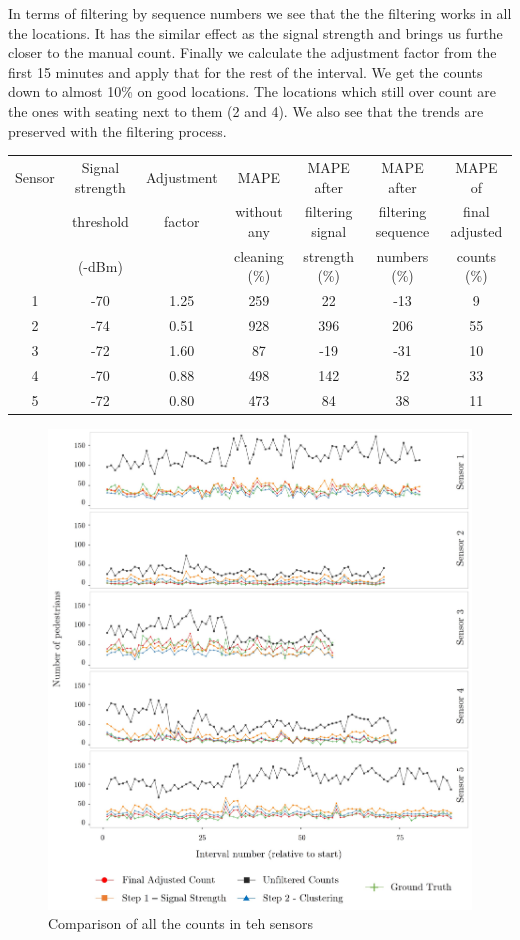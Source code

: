 In terms of filtering by sequence numbers we see that the the filtering works in all the locations. It has the similar effect as the signal strength and brings us furthe closer to the manual count. Finally we calculate the adjustment factor from the first 15 minutes and apply that for the rest of the interval. We get the counts down to almost 10\% on good locations. The locations which still over count are the ones with seating next to them (2 and 4). We also see that the trends are preserved with the filtering process.

\begin{table}
	{\begin{tabular}{ccccccc} 
		\toprule
			Sensor & Signal strength & Adjustment & MAPE & MAPE after & MAPE after & MAPE of\\
			& threshold & factor & without any & filtering signal & filtering sequence & final adjusted\\
			& (-dBm) & &  cleaning (\%) & strength (\%) & numbers (\%) & counts (\%)\\
		 \midrule
			1 & -70 & 1.25 & 259 &  22 & -13 &  9 \\
			2 & -74 & 0.51 & 928 & 396 & 206 & 55 \\
			3 & -72 & 1.60 &  87 & -19 & -31 & 10 \\
			4 & -70 & 0.88 & 498 & 142 &  52 & 33 \\
			5 & -72 & 0.80 & 473 &  84 &  38 & 11 \\
		 \bottomrule
	\end{tabular}}
	\label{errors-table}
\end{table}

\begin{figure}
	\begin{center}
		\includegraphics [width=\linewidth,trim=6 6 6 6,clip] {images/main_comparison.jpeg}
		\caption{Comparison of all the counts in teh sensors}
		\label{main_comparison}
	\end{center}
\end{figure}


